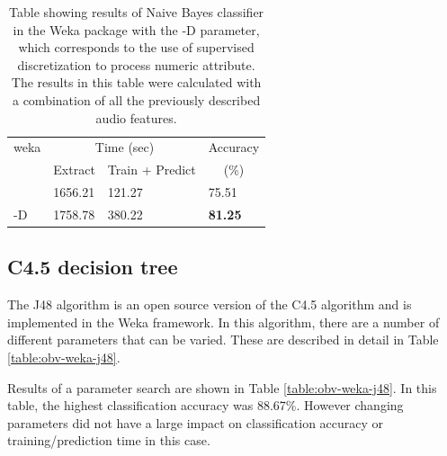 \documentclass[12pt,oneside]{book}
\begin{document}
\begin{table}
\begin{tabular}{|l|l|l|l|}
\hline
\multicolumn{1}{|c|}{weka} & \multicolumn{2}{c|}{Time (sec)} & Accuracy \\
\hhline{|~|-|-|~|}
\multicolumn{1}{|c|}{param} & Extract & Train + Predict & \multicolumn{1}{c|}{(\%)} \\
\hhline{|=|=|=|=|}
    &  1656.21  &     121.27  &  75.51  \\
-D  &  1758.78  &     380.22  &  \textbf{81.25}  \\
\hline
\end{tabular}
\caption{Table showing results of Naive Bayes
  classifier in the Weka package with the -D parameter, which
  corresponds to the use of supervised discretization to process
  numeric attribute.  The results in this table were calculated with a
  combination of all the previously described audio features.}
\label{table:obv-weka-naiveBayes}
\end{table}


%
%
\subsection{C4.5 decision tree}

The J48 algorithm is an open source version of the C4.5 algorithm and
is implemented in the Weka framework.  In this algorithm, there are a
number of different parameters that can be varied.  These are
described in detail in Table \ref{table:obv-weka-j48}.

Results of a parameter search are shown in Table
\ref{table:obv-weka-j48}.  In this table, the highest classification
accuracy was 88.67\%.  However changing parameters did not have a
large impact on classification accuracy or training/prediction time in
this case.
\end{document}
